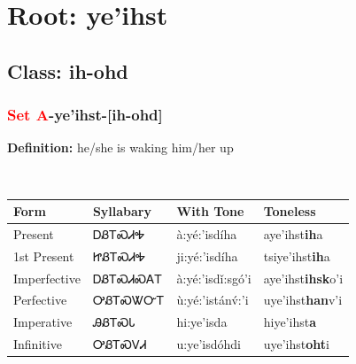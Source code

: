 \needspace{4in}
\section*{Root: ye'ihst}
\nopagebreak
{}
\needspace{3in}
\subsection*{Class: ih-ohd}
\nopagebreak
\needspace{2in}
\subsubsection*{\textcolor{Red}{Set A}{-}\textbf{ye'ihst}{-}[ih-ohd]}
\nopagebreak
\textbf{Definition: } he/she is waking him/her up
\\[0.5em]
\begin{tabularx}{\textwidth}{l X X X}%
\toprule%
\textbf{Form}&\textbf{Syllabary}&\textbf{With Tone}&\textbf{Toneless}\\%
\midrule%
Present&ᎠᏰᎢᏍᏗᎭ&à:yé:’isdíha&aye'ihst\textbf{ih}a\\%
1st Present&ᏥᏰᎢᏍᏗᎭ&ji:yé:’isdíha&tsiye'ihst\textbf{ih}a\\%
Imperfective&ᎠᏰᎢᏍᏗᏍᎪᎢ&à:yé:’isdǐ:sgó’i&aye'ihst\textbf{ihsk}o'i\\%
Perfective&ᎤᏰᎢᏍᏔᏅᎢ&ù:yé:’istánv́:’i&uye'ihst\textbf{han}v'i\\%
Imperative&ᎯᏰᎢᏍᏓ&hi:ye’isda&hiye'ihst\textbf{a}\\%
Infinitive&ᎤᏰᎢᏍᏙᏗ&u:ye’isdóhdi&uye'ihst\textbf{oht}i\\%
\bottomrule%
\end{tabularx}
\\[1em]